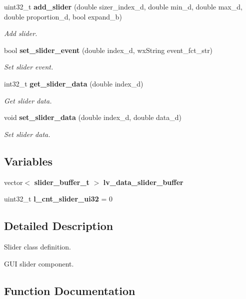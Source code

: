 \begin{DoxyCompactItemize}
uint32\+\_\+t \textbf{ add\+\_\+slider} (double sizer\+\_\+index\+\_\+d, double min\+\_\+d, double max\+\_\+d, double proportion\+\_\+d, bool expand\+\_\+b)
\begin{DoxyCompactList}\small\item\em Add slider. \end{DoxyCompactList}\item 
bool \textbf{ set\+\_\+slider\+\_\+event} (double index\+\_\+d, wx\+String event\+\_\+fct\+\_\+str)
\begin{DoxyCompactList}\small\item\em Set slider event. \end{DoxyCompactList}\item 
int32\+\_\+t \textbf{ get\+\_\+slider\+\_\+data} (double index\+\_\+d)
\begin{DoxyCompactList}\small\item\em Get slider data. \end{DoxyCompactList}\item 
void \textbf{ set\+\_\+slider\+\_\+data} (double index\+\_\+d, double data\+\_\+d)
\begin{DoxyCompactList}\small\item\em Set slider data. \end{DoxyCompactList}\end{DoxyCompactItemize}
\subsection*{Variables}
\begin{DoxyCompactItemize}
\item 
vector$<$ \textbf{ slider\+\_\+buffer\+\_\+t} $>$ \textbf{ lv\+\_\+data\+\_\+slider\+\_\+buffer}
\item 
\mbox{\label{group___slider_ga7ff3e56a02278a8a9dc76e2674a0beb9}} 
uint32\+\_\+t {\bfseries l\+\_\+cnt\+\_\+slider\+\_\+ui32} = 0
\end{DoxyCompactItemize}


\subsection{Detailed Description}
Slider class definition. 

G\+UI slider component.

\subsection{Function Documentation}
\mbox{\label{group___slider_ga490542606fe12f142cd2b00cb1ecaefd}} 
